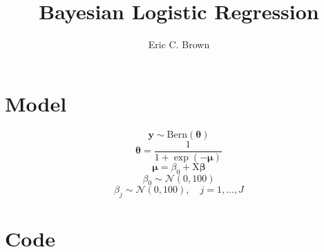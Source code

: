\documentclass{article}\usepackage[]{graphicx}\usepackage[]{color}
\begin{document}
\title{Bayesian Logistic Regression}
\author{Eric C. Brown}
\maketitle







\section{Model}
$$\textbf{y} \sim \mathrm{Bern}(\bm{\theta})$$
$$\bm{\theta} = \frac{1}{1 + \exp(-\bm{\mu})}$$
$$\bm{\mu} = \beta_0 + \bm{\mathrm{X}} \bm{\beta}$$
$$\beta_0 \sim \mathcal{N}(0,100)$$
$$\beta_j \sim \mathcal{N}(0,100), \quad j=1,\dots,J$$

\section{Code}
\end{document}
